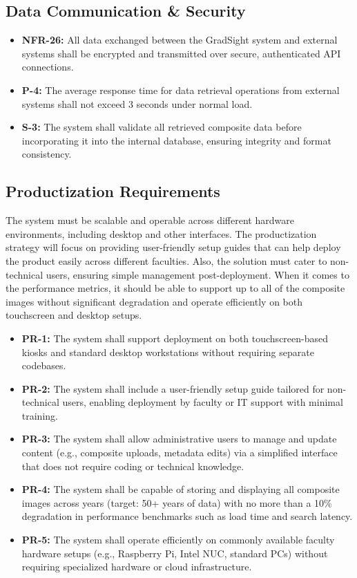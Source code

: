 \documentclass[12pt]{article}
\begin{document}
\subsection*{Data Communication \& Security}
\begin{itemize}
    \item \textbf{NFR-26:} All data exchanged between the GradSight system and external systems shall be encrypted and transmitted over secure, authenticated API connections.
    \item \textbf{P-4:} The average response time for data retrieval operations from external systems shall not exceed 3 seconds under normal load.
    \item \textbf{S-3:} The system shall validate all retrieved composite data before incorporating it into the internal database, ensuring integrity and format consistency.
\end{itemize}

\subsection{Productization Requirements}
The system must be scalable and operable across different hardware environments, including desktop and other interfaces. The productization strategy will focus on providing user-friendly setup guides that can help deploy the product easily across different faculties. Also, the solution must cater to non-technical users, ensuring simple management post-deployment. When it comes to the performance metrics, it should be able to support up to all of the composite images without significant degradation and operate efficiently on both touchscreen and desktop setups.

\begin{itemize}
    \item \textbf{PR-1:} The system shall support deployment on both touchscreen-based kiosks and standard desktop workstations without requiring separate codebases.
    \item \textbf{PR-2:} The system shall include a user-friendly setup guide tailored for non-technical users, enabling deployment by faculty or IT support with minimal training.
    \item \textbf{PR-3:} The system shall allow administrative users to manage and update content (e.g., composite uploads, metadata edits) via a simplified interface that does not require coding or technical knowledge.
    \item \textbf{PR-4:} The system shall be capable of storing and displaying all composite images across years (target: 50+ years of data) with no more than a 10\% degradation in performance benchmarks such as load time and search latency.
    \item \textbf{PR-5:} The system shall operate efficiently on commonly available faculty hardware setups (e.g., Raspberry Pi, Intel NUC, standard PCs) without requiring specialized hardware or cloud infrastructure.
\end{itemize}
\end{document}
